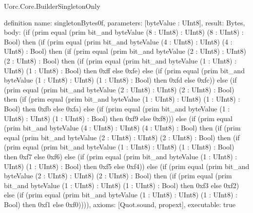 \begin{lexlean}{Uorc.Core.BuilderSingletonOnly}
\begin{semanticmodule}
definition{
  name: singletonBytes0f,
  parameters: [byteValue : UInt8],
  result: Bytes,
  body: (if (prim equal (prim bit_and byteValue (8 : UInt8) : UInt8) (8 : UInt8) : Bool) then (if (prim equal (prim bit_and byteValue (4 : UInt8) : UInt8) (4 : UInt8) : Bool) then (if (prim equal (prim bit_and byteValue (2 : UInt8) : UInt8) (2 : UInt8) : Bool) then (if (prim equal (prim bit_and byteValue (1 : UInt8) : UInt8) (1 : UInt8) : Bool) then 0xff else 0xfe) else (if (prim equal (prim bit_and byteValue (1 : UInt8) : UInt8) (1 : UInt8) : Bool) then 0xfd else 0xfc)) else (if (prim equal (prim bit_and byteValue (2 : UInt8) : UInt8) (2 : UInt8) : Bool) then (if (prim equal (prim bit_and byteValue (1 : UInt8) : UInt8) (1 : UInt8) : Bool) then 0xfb else 0xfa) else (if (prim equal (prim bit_and byteValue (1 : UInt8) : UInt8) (1 : UInt8) : Bool) then 0xf9 else 0xf8))) else (if (prim equal (prim bit_and byteValue (4 : UInt8) : UInt8) (4 : UInt8) : Bool) then (if (prim equal (prim bit_and byteValue (2 : UInt8) : UInt8) (2 : UInt8) : Bool) then (if (prim equal (prim bit_and byteValue (1 : UInt8) : UInt8) (1 : UInt8) : Bool) then 0xf7 else 0xf6) else (if (prim equal (prim bit_and byteValue (1 : UInt8) : UInt8) (1 : UInt8) : Bool) then 0xf5 else 0xf4)) else (if (prim equal (prim bit_and byteValue (2 : UInt8) : UInt8) (2 : UInt8) : Bool) then (if (prim equal (prim bit_and byteValue (1 : UInt8) : UInt8) (1 : UInt8) : Bool) then 0xf3 else 0xf2) else (if (prim equal (prim bit_and byteValue (1 : UInt8) : UInt8) (1 : UInt8) : Bool) then 0xf1 else 0xf0)))),
  axioms: [Quot.sound, propext],
  executable: true
}


\end{semanticmodule}
\end{lexlean}
